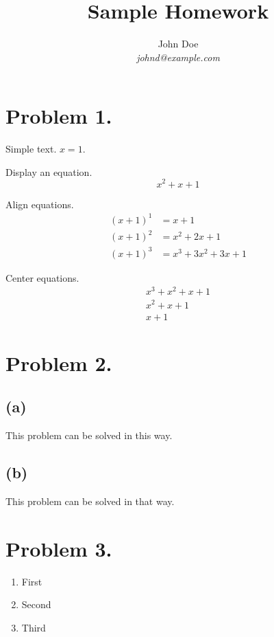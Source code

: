 \documentclass[a4paper,11pt]{article}
\begin{document}
\title{Sample Homework}
\author{John Doe\\\textit{johnd@example.com}}
\maketitle

\section*{Problem 1.}

Simple text. $x = 1$.

Display an equation.
\[
  x^2 + x + 1
\]

Align equations.
\begin{align*}
  {(x + 1)}^1 &= x + 1 \\
  {(x + 1)}^2 &= x^2 + 2x + 1 \\
  {(x + 1)}^3 &= x^3 + 3x^2 + 3x + 1
\end{align*}

Center equations.
\begin{gather*}
  x^3 + x^2 + x + 1 \\
  x^2 + x + 1 \\
  x + 1
\end{gather*}

\section*{Problem 2.}

\subsection*{(a)}

This problem can be solved in this way.

\subsection*{(b)}

This problem can be solved in that way.

\section*{Problem 3.}

\begin{enumerate}
  \item First

  \item Second

  \item Third
\end{enumerate}
\end{document}
